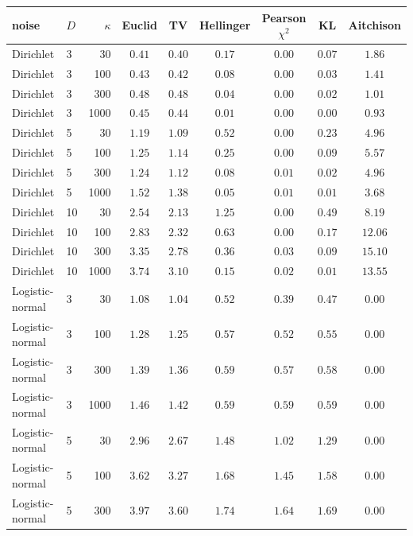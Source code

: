 \begin{tabular}{llrcccccc}\toprule
noise & $D$ & $\kappa$ & Euclid & TV & Hellinger & Pearson $\chi^2$ & KL & Aitchison\\\midrule
Dirichlet & 3 & 30 & $0.41$ & $0.40$ & $0.17$ & $\mathbf{0.00}$ & $0.07$ & $1.86$\\
Dirichlet & 3 & 100 & $0.43$ & $0.42$ & $0.08$ & $\mathbf{0.00}$ & $\mathbf{0.03}$ & $1.41$\\
Dirichlet & 3 & 300 & $0.48$ & $0.48$ & $\mathbf{0.04}$ & $\mathbf{0.00}$ & $\mathbf{0.02}$ & $1.01$\\
Dirichlet & 3 & 1000 & $0.45$ & $0.44$ & $\mathbf{0.01}$ & $\mathbf{0.00}$ & $\mathbf{0.00}$ & $0.93$\\
Dirichlet & 5 & 30 & $1.19$ & $1.09$ & $0.52$ & $\mathbf{0.00}$ & $0.23$ & $4.96$\\
Dirichlet & 5 & 100 & $1.25$ & $1.14$ & $0.25$ & $\mathbf{0.00}$ & $0.09$ & $5.57$\\
Dirichlet & 5 & 300 & $1.24$ & $1.12$ & $0.08$ & $\mathbf{0.01}$ & $\mathbf{0.02}$ & $4.96$\\
Dirichlet & 5 & 1000 & $1.52$ & $1.38$ & $\mathbf{0.05}$ & $\mathbf{0.01}$ & $\mathbf{0.01}$ & $3.68$\\
Dirichlet & 10 & 30 & $2.54$ & $2.13$ & $1.25$ & $\mathbf{0.00}$ & $0.49$ & $8.19$\\
Dirichlet & 10 & 100 & $2.83$ & $2.32$ & $0.63$ & $\mathbf{0.00}$ & $0.17$ & $12.06$\\
Dirichlet & 10 & 300 & $3.35$ & $2.78$ & $0.36$ & $\mathbf{0.03}$ & $0.09$ & $15.10$\\
Dirichlet & 10 & 1000 & $3.74$ & $3.10$ & $0.15$ & $\mathbf{0.02}$ & $\mathbf{0.01}$ & $13.55$\\
Logistic-normal & 3 & 30 & $1.08$ & $1.04$ & $0.52$ & $0.39$ & $0.47$ & $\mathbf{0.00}$\\
Logistic-normal & 3 & 100 & $1.28$ & $1.25$ & $0.57$ & $0.52$ & $0.55$ & $\mathbf{0.00}$\\
Logistic-normal & 3 & 300 & $1.39$ & $1.36$ & $0.59$ & $0.57$ & $0.58$ & $\mathbf{0.00}$\\
Logistic-normal & 3 & 1000 & $1.46$ & $1.42$ & $0.59$ & $0.59$ & $0.59$ & $\mathbf{0.00}$\\
Logistic-normal & 5 & 30 & $2.96$ & $2.67$ & $1.48$ & $1.02$ & $1.29$ & $\mathbf{0.00}$\\
Logistic-normal & 5 & 100 & $3.62$ & $3.27$ & $1.68$ & $1.45$ & $1.58$ & $\mathbf{0.00}$\\
Logistic-normal & 5 & 300 & $3.97$ & $3.60$ & $1.74$ & $1.64$ & $1.69$ & $\mathbf{0.00}$\\

\end{tabular}
